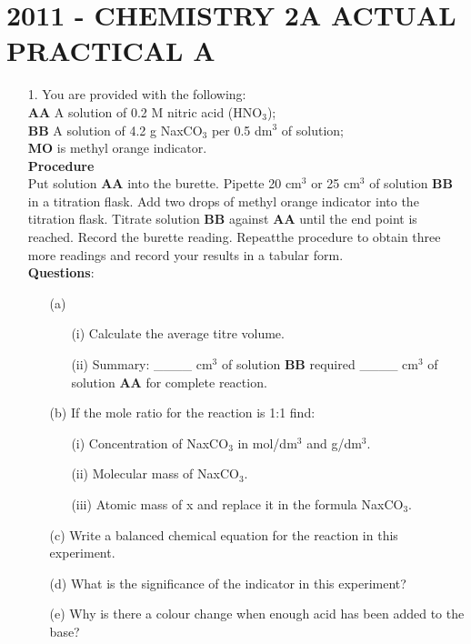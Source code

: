 \section{2011 - CHEMISTRY 2A ACTUAL PRACTICAL A} 

\begin{enumerate}
\item[1.] You are provided with the following:\\
\textbf{AA}  A solution of 0.2 M nitric acid (HNO$_3$);\\
\textbf{BB}  A solution of 4.2 g NaxCO$_3$ per 0.5 dm$^3$ of solution;\\
\textbf{MO} is methyl orange indicator.\\[10pt]

\textbf{Procedure}\\

Put solution \textbf{AA} into the burette. Pipette 20 cm$^3$ or 25 cm$^3$ of solution \textbf{BB} in a titration flask. Add two drops of methyl orange indicator into the titration flask. Titrate solution \textbf{BB} against \textbf{AA} until the end point is reached. Record the burette reading. Repeatthe procedure to obtain three more readings and record your results in a tabular form.\\[10pt]

\textbf{Questions}:\\
\begin{enumerate}
\item[(a)] 
\begin{enumerate}
\item[(i)] Calculate the average titre volume.
\item[(ii)] Summary:  \_\_\_\_ cm$^3$ of solution \textbf{BB} required \_\_\_\_ cm$^3$ of solution \textbf{AA} for complete reaction.
\end{enumerate}

\item[(b)] If the mole ratio for the reaction is 1:1 find:\\
\begin{enumerate}
\item[(i)] Concentration of NaxCO$_3$ in mol/dm$^3$ and g/dm$^3$.
\item[(ii)] Molecular mass of NaxCO$_3$.
\item[(iii)] Atomic mass of x and replace it in the formula NaxCO$_3$.
\end{enumerate}

\item[(c)] Write a balanced chemical equation for the reaction in this experiment.
\item[(d)] What is the significance of the indicator in this experiment?
\item[(e)] Why is there a colour change when enough acid has been added to the base?


\end{enumerate}
\end{enumerate}
